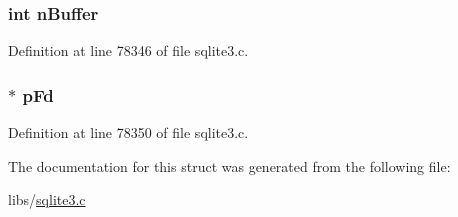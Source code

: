 \subsubsection[{n\+Buffer}]{\setlength{\rightskip}{0pt plus 5cm}int n\+Buffer}\label{struct_pma_writer_aaa5118b1ad1ecd130e422b18371df061}


Definition at line 78346 of file sqlite3.\+c.

\hypertarget{struct_pma_writer_ae44362cf35caac454319be8c145e374e}{}
\subsubsection[{p\+Fd}]{$\ast$ p\+Fd}\label{struct_pma_writer_ae44362cf35caac454319be8c145e374e}


Definition at line 78350 of file sqlite3.\+c.



The documentation for this struct was generated from the following file\+:\begin{DoxyCompactItemize}
\item 
libs/\hyperlink{sqlite3_8c}{sqlite3.\+c}\end{DoxyCompactItemize}
